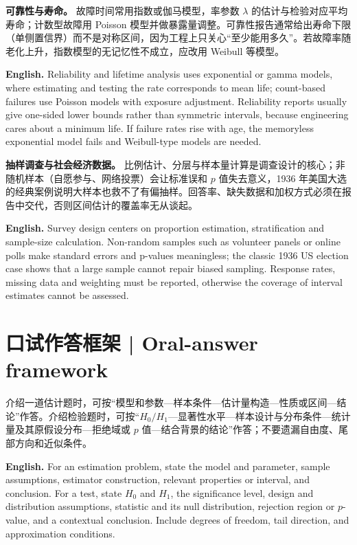 \documentclass[UTF8,11pt,a4paper]{ctexart}
\newcommand{\EN}[1]{\par\noindent\textbf{English.} #1\par}
\begin{document}
\noindent\textbf{可靠性与寿命。} 故障时间常用指数或伽马模型，率参数 $\lambda$ 的估计与检验对应平均寿命；计数型故障用 Poisson 模型并做暴露量调整。可靠性报告通常给出寿命下限（单侧置信界）而不是对称区间，因为工程上只关心“至少能用多久”。若故障率随老化上升，指数模型的无记忆性不成立，应改用 Weibull 等模型。
\EN{Reliability and lifetime analysis uses exponential or gamma models, where estimating and testing the rate corresponds to mean life; count-based failures use Poisson models with exposure adjustment. Reliability reports usually give one-sided lower bounds rather than symmetric intervals, because engineering cares about a minimum life. If failure rates rise with age, the memoryless exponential model fails and Weibull-type models are needed.}

\noindent\textbf{抽样调查与社会经济数据。} 比例估计、分层与样本量计算是调查设计的核心；非随机样本（自愿参与、网络投票）会让标准误和 $p$ 值失去意义，1936 年美国大选的经典案例说明大样本也救不了有偏抽样。回答率、缺失数据和加权方式必须在报告中交代，否则区间估计的覆盖率无从谈起。
\EN{Survey design centers on proportion estimation, stratification and sample-size calculation. Non-random samples such as volunteer panels or online polls make standard errors and p-values meaningless; the classic 1936 US election case shows that a large sample cannot repair biased sampling. Response rates, missing data and weighting must be reported, otherwise the coverage of interval estimates cannot be assessed.}

\section*{口试作答框架 | Oral-answer framework}
介绍一道估计题时，可按“模型和参数—样本条件—估计量构造—性质或区间—结论”作答。介绍检验题时，可按“$H_0/H_1$—显著性水平—样本设计与分布条件—统计量及其原假设分布—拒绝域或 $p$ 值—结合背景的结论”作答；不要遗漏自由度、尾部方向和近似条件。
\EN{For an estimation problem, state the model and parameter, sample assumptions, estimator construction, relevant properties or interval, and conclusion. For a test, state $H_0$ and $H_1$, the significance level, design and distribution assumptions, statistic and its null distribution, rejection region or $p$-value, and a contextual conclusion. Include degrees of freedom, tail direction, and approximation conditions.}
\end{document}
